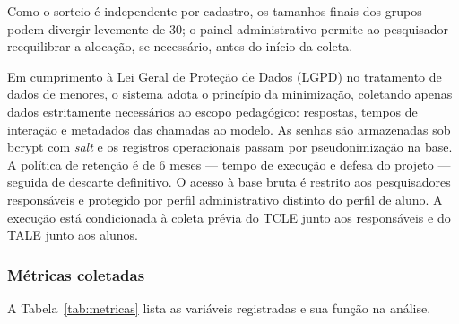 \documentclass[10pt, a4paper, twocolumn]{article}
\begin{document}
Como o sorteio é independente por cadastro, os tamanhos finais dos grupos podem
divergir levemente de 30; o painel administrativo permite ao pesquisador
reequilibrar a alocação, se necessário, antes do início da coleta.

Em cumprimento à Lei Geral de Proteção de Dados (LGPD) no tratamento de dados de
menores, o sistema adota o princípio da minimização, coletando apenas dados
estritamente necessários ao escopo pedagógico: respostas, tempos de interação e
metadados das chamadas ao modelo. As senhas são armazenadas sob bcrypt com
\textit{salt} e os registros operacionais passam por pseudonimização na base. A
política de retenção é de 6 meses --- tempo de execução e defesa do projeto ---
seguida de descarte definitivo. O acesso à base bruta é restrito aos
pesquisadores responsáveis e protegido por perfil administrativo distinto do
perfil de aluno. A execução está condicionada à coleta prévia do TCLE junto aos
responsáveis e do TALE junto aos alunos.

\subsubsection{Métricas coletadas}

A Tabela~\ref{tab:metricas} lista as variáveis registradas e sua função na
análise.

\begin{table}[H]
\centering
\small
\caption{Variáveis coletadas e finalidade}
\label{tab:metricas}
\vspace{0.13cm}
\end{table}
\end{document}
